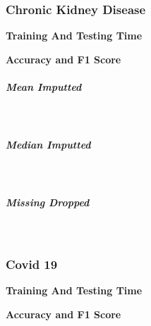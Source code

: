 \documentclass[11pt]{article}
\begin{document}
    \hypertarget{chronic-kidney-disease}{%
\subsubsection{Chronic Kidney Disease}\label{chronic-kidney-disease}}

    \textbf{Training And Testing Time}

    

    \textbf{Accuracy and F1 Score}

    \hypertarget{mean-imputted}{%
\subparagraph{Mean Imputted}\label{mean-imputted}}

    \begin{center}
    \end{center}
    { \hspace*{\fill} \\}
    
    \hypertarget{median-imputted}{%
\subparagraph{Median Imputted}\label{median-imputted}}

    \begin{center}
    \end{center}
    { \hspace*{\fill} \\}
    
    \hypertarget{missing-dropped}{%
\subparagraph{Missing Dropped}\label{missing-dropped}}

    \begin{center}
    \end{center}
    { \hspace*{\fill} \\}
    
    \hypertarget{covid-19}{%
\subsubsection{Covid 19}\label{covid-19}}

    \textbf{Training And Testing Time}

    

    \textbf{Accuracy and F1 Score}

    \begin{center}
    \end{center}
    { \hspace*{\fill} \\}
    
\end{document}
